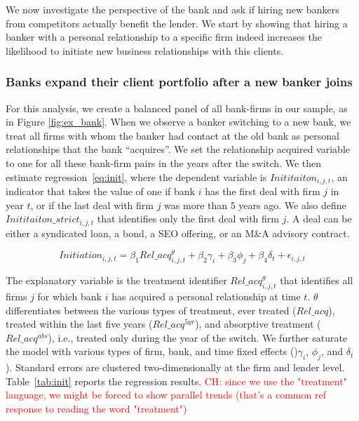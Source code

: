 We now investigate the perspective of the bank and ask if hiring new bankers from competitors actually benefit the lender. We start by showing that hiring a banker with a personal relationship to a specific firm indeed increases the likelihood to initiate new business relationships with this clients. %

\subsubsection{Banks expand their client portfolio after a new banker joins}
For this analysis, we create a balanced panel of all bank-firms in our sample, as in Figure \ref{fig:ex_bank}. %
When we observe a banker switching to a new bank, we treat all firms with whom the banker had contact at the old bank as personal relationships that the bank ``acquires''. We set the relationship acquired variable to one for all these bank-firm pairs in the years after the switch. We then estimate regression~\ref{eq:init}, where the dependent variable is $Inititaiton_{i,j,t}$, an indicator that takes the value of one if bank $i$ has the first deal with firm $j$ in year $t$, or if the last deal with firm $j$ was more than 5 years ago.  We also define $Inititaiton\_strict_{i,j,t}$ that identifies only the first deal with firm $j$. A deal can be either a syndicated loan, a bond, a SEO offering, or an M\&A advisory contract.

\begin{equation} \label{eq:init}
Initiation_{i,j,t} = \beta_1 Rel\_acq^\theta_{i,j,t} + \beta_2 \gamma_i + \beta_3 \phi_j + \beta_4 \delta_{t} + \epsilon_{i,j,t}
\end{equation}

The explanatory variable is the treatment identifier $Rel\_acq^\theta_{i,j,t}$ that identifies all firms $j$ for which bank $i$ has acquired a personal relationship at time $t$. $\theta$ differentiates between the various types of treatment, ever treated ($Rel\_acq$), treated within the last five years ($Rel\_acq^{5yr}$), and absorptive treatment ($Rel\_acq^{abs}$), i.e., treated only during the year of the switch. We further saturate the model with various types of firm, bank, and time fixed effects ()$\gamma_{i}$, $\phi_{j}$, and $\delta_{t}$). 
Standard errors are clustered two-dimensionally at the firm and lender level. Table~\ref{tab:init} reports the regression results. \textcolor{red}{CH: since we use the "treatment" language, we might be forced to show parallel trends (that's a common ref response to reading the word "treatment")}

